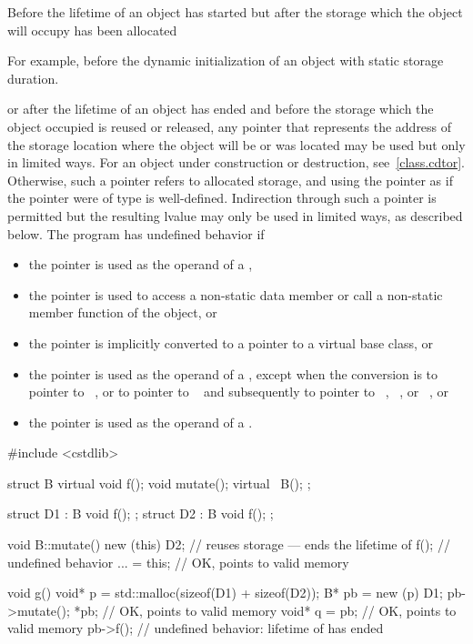 \pnum
Before the lifetime of an object has started but after the storage which
the object will occupy has been allocated
\begin{footnote}
For example, before the dynamic initialization of
an object with static storage duration.
\end{footnote}
or after the lifetime of an object has ended and before the storage
which the object occupied is reused or released, any pointer that represents the address of
the storage location where the object will be or was located may be
used but only in limited ways.
For an object under construction or destruction, see~\ref{class.cdtor}.
Otherwise, such
a pointer refers to allocated
storage, and using the pointer as
if the pointer were of type  is
well-defined. Indirection through such a pointer is permitted but the resulting lvalue may only be used in
limited ways, as described below. The
program has undefined behavior if
\begin{itemize}
\item
  the pointer is used as the operand of a ,
\item
  the pointer is used to access a non-static data member or call a
  non-static member function of the object, or
\item
  the pointer is implicitly converted to a pointer
  to a virtual base class, or
\item
  the pointer is used as the operand of a
  , except when the conversion
  is to pointer to \cv{}~, or to pointer to \cv{}~
  and subsequently to pointer to
  \cv{}~,
  \cv{}~, or
  \cv{}~, or
\item
  the pointer is used as the operand of a
  .
\end{itemize}
\begin{example}
\begin{codeblock}
#include <cstdlib>

struct B {
  virtual void f();
  void mutate();
  virtual ~B();
};

struct D1 : B { void f(); };
struct D2 : B { void f(); };

void B::mutate() {
  new (this) D2;    // reuses storage --- ends the lifetime of 
  f();              // undefined behavior
  ... = this;       // OK,  points to valid memory
}

void g() {
  void* p = std::malloc(sizeof(D1) + sizeof(D2));
  B* pb = new (p) D1;
  pb->mutate();
  *pb;              // OK,  points to valid memory
  void* q = pb;     // OK,  points to valid memory
  pb->f();          // undefined behavior: lifetime of  has ended
}
\end{codeblock}
\end{example}

